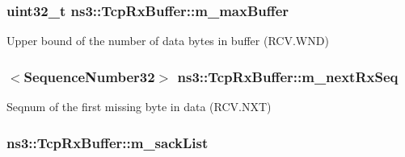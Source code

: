 \subsubsection[{\texorpdfstring{m\+\_\+max\+Buffer}{m_maxBuffer}}]{\setlength{\rightskip}{0pt plus 5cm}uint32\+\_\+t ns3\+::\+Tcp\+Rx\+Buffer\+::m\+\_\+max\+Buffer\hspace{0.3cm}{\ttfamily [private]}}\hypertarget{classns3_1_1TcpRxBuffer_a9889bd68e8bf6b250e0ee363ab30f457}{}\label{classns3_1_1TcpRxBuffer_a9889bd68e8bf6b250e0ee363ab30f457}


Upper bound of the number of data bytes in buffer (R\+C\+V.\+W\+ND) 

\subsubsection[{\texorpdfstring{m\+\_\+next\+Rx\+Seq}{m_nextRxSeq}}]{$<${\bf Sequence\+Number32}$>$ ns3\+::\+Tcp\+Rx\+Buffer\+::m\+\_\+next\+Rx\+Seq\hspace{0.3cm}{\ttfamily [private]}}\hypertarget{classns3_1_1TcpRxBuffer_ab4390502dee7085dad4f7c3f9ef8796b}{}\label{classns3_1_1TcpRxBuffer_ab4390502dee7085dad4f7c3f9ef8796b}


Seqnum of the first missing byte in data (R\+C\+V.\+N\+XT) 

\subsubsection[{\texorpdfstring{m\+\_\+sack\+List}{m_sackList}}]{ ns3\+::\+Tcp\+Rx\+Buffer\+::m\+\_\+sack\+List\hspace{0.3cm}{\ttfamily [private]}}\hypertarget{classns3_1_1TcpRxBuffer_aee4aac20f3e96f9108918d3650e58eb9}{}\label{classns3_1_1TcpRxBuffer_aee4aac20f3e96f9108918d3650e58eb9}


